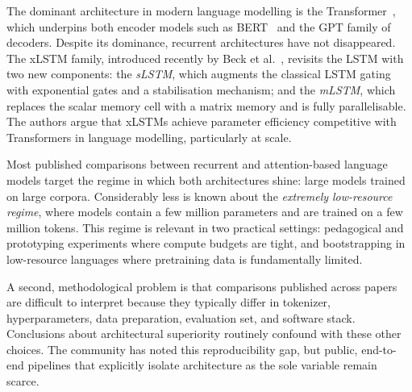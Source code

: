 \documentclass[11pt]{article}
\begin{document}
The dominant architecture in modern language modelling is the
Transformer~\cite{vaswani2017}, which underpins both encoder
models such as BERT~\cite{devlin2019} and the GPT family of decoders.
Despite its dominance, recurrent architectures have not disappeared. The
xLSTM family, introduced recently by Beck et al.~\cite{beck2024}, revisits
the LSTM with two new components: the \emph{sLSTM}, which augments the
classical LSTM gating with exponential gates and a stabilisation mechanism;
and the \emph{mLSTM}, which replaces the scalar memory cell with a matrix
memory and is fully parallelisable. The authors argue that xLSTMs achieve
parameter efficiency competitive with Transformers in language modelling,
particularly at scale.

Most published comparisons between recurrent and attention-based language
models target the regime in which both architectures shine: large models
trained on large corpora. Considerably less is known about the
\emph{extremely low-resource regime}, where models contain a few million
parameters and are trained on a few million tokens. This regime is relevant
in two practical settings: pedagogical and prototyping experiments where
compute budgets are tight, and bootstrapping in low-resource languages
where pretraining data is fundamentally limited.

A second, methodological problem is that comparisons published across
papers are difficult to interpret because they typically differ in
tokenizer, hyperparameters, data preparation, evaluation set, and software
stack. Conclusions about architectural superiority routinely confound with
these other choices. The community has noted this reproducibility gap, but
public, end-to-end pipelines that explicitly isolate architecture as
the sole variable remain scarce.
\end{document}
